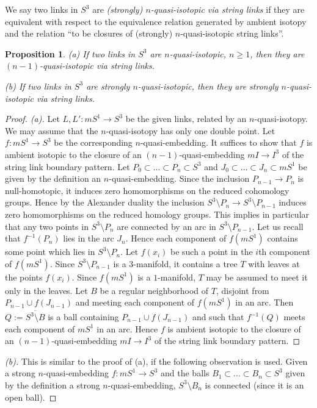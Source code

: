 \documentclass[a4paper,12pt,reqno,oneside]{amsart} %
\theoremstyle{plain}
\newtheorem{proposition}[theorem]{Proposition}
\theoremstyle{definition}
\theoremstyle{named}
\def\but{\setminus}
\renewcommand{\:}{\colon}
\begin{document}
We say two links in $S^3$ are {\it (strongly) $n$-quasi-isotopic via string links} if they are equivalent with
respect to the equivalence relation generated by ambient isotopy and the relation ``to be closures of (strongly) 
$n$-quasi-isotopic string links''. 

\begin{proposition} \label{string-quasi} (a) If two links in $S^3$ are $n$-quasi-isotopic, $n\ge 1$, then they 
are $(n-1)$-quasi-isotopic via string links.

(b) If two links in $S^3$ are strongly $n$-quasi-isotopic, then they 
are strongly $n$-quasi-isotopic via string links.
\end{proposition}

\begin{proof}[Proof. (a)] Let $L,L'\:mS^1\to S^3$ be the given links, related by an $n$-quasi-isotopy.
We may assume that the $n$-quasi-isotopy has only one double point.
Let $f\:mS^1\to S^3$ be the corresponding $n$-quasi-embedding.
It suffices to show that $f$ is ambient isotopic to the closure of an $(n-1)$-quasi-embedding $mI\to I^3$
of the string link boundary pattern.
Let $P_0\subset\dots\subset P_n\subset S^3$ and $J_0\subset\dots\subset J_n\subset mS^1$ be given by 
the definition an $n$-quasi-embedding.
Since the inclusion $P_{n-1}\to P_n$ is null-homotopic, it induces zero homomorphisms on the reduced 
cohomology groups.
Hence by the Alexander duality the inclusion $S^3\but P_n\to S^3\but P_{n-1}$ induces zero homomorphisms
on the reduced homology groups.
This implies in particular that any two points in $S^3\but P_n$ are connected by an arc in $S^3\but P_{n-1}$.
Let us recall that $f^{-1}(P_n)$ lies in the arc $J_n$.
Hence each component of $f(mS^1)$ contains some point which lies in $S^3\but P_n$.
Let $f(x_i)$ be such a point in the $i$th component of $f(mS^1)$.
Since $S^3\but P_{n-1}$ is a $3$-manifold, it contains a tree $T$ with leaves at the points $f(x_i)$.
Since $f(mS^1)$ is a $1$-manifold, $T$ may be assumed to meet it only in the leaves.
Let $B$ be a regular neighborhood of $T$, disjoint from $P_{n-1}\cup f(J_{n-1})$ and meeting each component 
of $f(mS^1)$ in an arc.
Then $Q:=\overline{S^3\but B}$ is a ball containing $P_{n-1}\cup f(J_{n-1})$ and such that $f^{-1}(Q)$
meets each component of  $mS^1$ in an arc.
Hence $f$ is ambient isotopic to the closure of an $(n-1)$-quasi-embedding $mI\to I^3$
of the string link boundary pattern.
\end{proof}

\begin{proof}[(b)] This is similar to the proof of (a), if the following observation is used.
Given a strong $n$-quasi-embedding $f\:mS^1\to S^3$ and the balls $B_1\subset\dots\subset B_n\subset S^3$
given by the definition a strong $n$-quasi-embedding, $S^3\but B_n$ is connected (since it is an open ball).
\end{proof}
\end{document}
